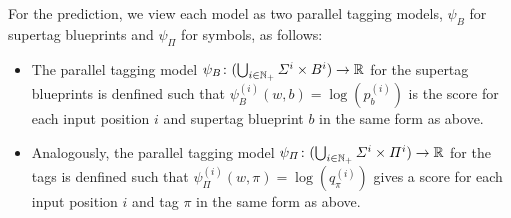 \documentclass[../../document.tex]{subfiles}
\begin{document}
    For the prediction, we view each model as two parallel tagging models, \(\psi_B\) for supertag blueprints and \(\psi_\varPi\) for  symbols, as follows:
    \begin{itemize}
        \item The parallel tagging model \(\psi_B\colon (\bigcup_{i\in\mathbb{N}_+} \varSigma^i \times B^i) \to \mathbb{R}\) for the supertag blueprints is denfined such that \(\psi_B^{(i)}(w, b) = \log(p_b^{(i)})\) is the score for each input position \(i\) and supertag blueprint \(b\) in the same form as above.
        \item Analogously, the parallel tagging model \(\psi_\varPi\colon (\bigcup_{i\in\mathbb{N}_+} \varSigma^i \times \varPi^i) \to \mathbb{R}\) for the  tags is denfined such that \(\psi_\varPi^{(i)}(w, \pi) = \log(q_\pi^{(i)})\) gives a score for each input position \(i\) and  tag \(\pi\) in the same form as above.
    \end{itemize}
\end{document}
